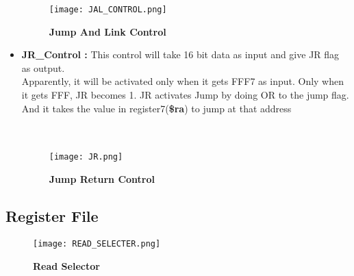 \documentclass[12pt]{article}
\begin{document}
\begin{itemize}

    \begin{figure}[H]
        \centering
        \texttt{[image: JAL\_CONTROL.png]}
        \caption{\textbf{Jump And Link Control}}
        \label{fig:4}
    \end{figure}
    
    \item \textbf{JR\_Control : } This control will take 16 bit data as input and give JR flag as output.\\
    Apparently, it will be activated only when it gets FFF7 as input. Only when it gets FFF, JR becomes 1. JR activates Jump by doing OR to the jump flag.
    And it takes the value in register7(\textbf{\$ra}) to jump at that address \\ \\ \\

    \begin{figure}[H]
        \centering
        \texttt{[image: JR.png]}
        \caption{\textbf{Jump Return Control}}
        \label{fig:5}
    \end{figure}

    
\end{itemize}
\subsection{Register File}

    

    \begin{figure}[H]
        \centering
        \texttt{[image: READ\_SELECTER.png]}
        \caption{\textbf{Read Selector}}
        \label{fig:6}
    \end{figure}
\end{document}
